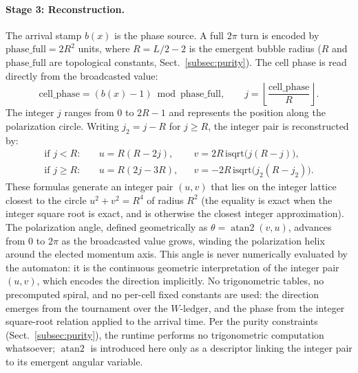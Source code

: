 \documentclass{ijuc}
\begin{document}
\paragraph{Stage 3: Reconstruction.}  The arrival stamp $b(x)$ is the phase source.  A full $2\pi$ turn is encoded by $\mathrm{phase\_full}=2R^{2}$ units, where $R=L/2-2$ is the emergent bubble radius ($R$ and $\mathrm{phase\_full}$ are topological constants, Sect.~\ref{subsec:purity}).  The cell phase is read directly from the broadcasted value:
\[
\mathrm{cell\_phase}=(b(x)-1)\bmod\mathrm{phase\_full}, \qquad j=\left\lfloor\frac{\mathrm{cell\_phase}}{R}\right\rfloor .
\]
The integer $j$ ranges from $0$ to $2R-1$ and represents the position along the polarization circle.  Writing $j_{2}=j-R$ for $j\ge R$, the integer pair is reconstructed by:
\begin{align}
\text{if }j<R:\quad&u=R(R-2j),          &&v=2R\,\mathrm{isqrt}\bigl(j(R-j)\bigr),\label{eq:polu}\\
\text{if }j\ge R:\quad&u=R(2j-3R),       &&v=-2R\,\mathrm{isqrt}\bigl(j_{2}(R-j_{2})\bigr).\label{eq:polv}
\end{align}
These formulas generate an integer pair $(u,v)$ that lies on the integer lattice closest to the circle $u^{2}+v^{2}=R^{4}$ of radius $R^{2}$ (the equality is exact when the integer square root is exact, and is otherwise the closest integer approximation).  The polarization angle, defined geometrically as $\theta=\operatorname{atan2}(v,u)$, advances from $0$ to $2\pi$ as the broadcasted value grows, winding the polarization helix around the elected momentum axis.  This angle is never numerically evaluated by the automaton: it is the continuous geometric interpretation of the integer pair $(u,v)$, which encodes the direction implicitly.  No trigonometric tables, no precomputed spiral, and no per-cell fixed constants are used: the direction emerges from the tournament over the $W$-ledger, and the phase from the integer square-root relation applied to the arrival time.  Per the purity constraints (Sect.~\ref{subsec:purity}), the runtime performs no trigonometric computation whatsoever; $\operatorname{atan2}$ is introduced here only as a descriptor linking the integer pair to its emergent angular variable.
\end{document}

